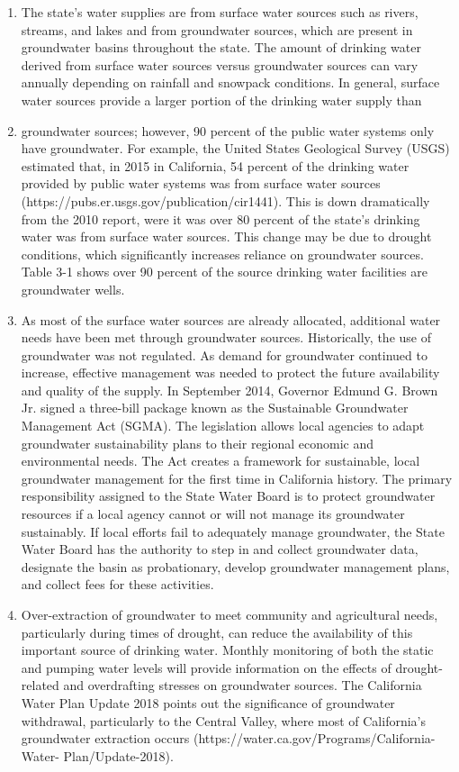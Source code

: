 \begin{itemize}
\begin{enumerate}
\item The state’s water supplies are from surface water sources such as rivers, streams, and lakes and from groundwater sources, which are present in groundwater basins throughout the state. The amount of drinking water derived from surface water sources versus groundwater sources can vary annually depending on rainfall and snowpack conditions. In general, surface water sources provide a larger portion of the drinking water supply than
\item groundwater sources; however, 90 percent of the public water systems only have groundwater. For example, the United States Geological Survey (USGS) estimated that, in 2015 in California, 54 percent of the drinking water provided by public water systems was from surface water sources (https://pubs.er.usgs.gov/publication/cir1441). This is down dramatically from the 2010 report, were it was over 80 percent of the state’s drinking water was from surface water sources. This change may be due to drought conditions, which significantly increases reliance on groundwater sources. Table 3-1 shows over 90 percent of the source drinking water facilities are groundwater wells.
\item As most of the surface water sources are already allocated, additional water needs have been met through groundwater sources. Historically, the use of groundwater was not regulated. As demand for groundwater continued to increase, effective management was needed to protect the future availability and quality of the supply. In September 2014, Governor Edmund G. Brown Jr. signed a three-bill package known as the Sustainable Groundwater Management Act (SGMA). The legislation allows local agencies to adapt groundwater sustainability plans to their regional economic and environmental needs. The Act creates a framework for sustainable, local groundwater management for the first time in California history. The primary responsibility assigned to the State Water Board is to protect groundwater resources if a local agency cannot or will not manage its groundwater sustainably. If local efforts fail to adequately manage groundwater, the State Water Board has the authority to step in and collect groundwater data, designate the basin as probationary, develop groundwater management plans, and collect fees for these activities. 
\item Over-extraction of groundwater to meet community and agricultural needs, particularly during times of drought, can reduce the availability of this important source of drinking water. Monthly monitoring of both the static and pumping water levels will provide information on the effects of drought-related and overdrafting stresses on groundwater sources. The California Water Plan Update 2018 points out the significance of groundwater withdrawal, particularly to the Central Valley, where most of California’s groundwater extraction occurs (https://water.ca.gov/Programs/California-Water- Plan/Update-2018).

\end{enumerate}
\end{itemize}
